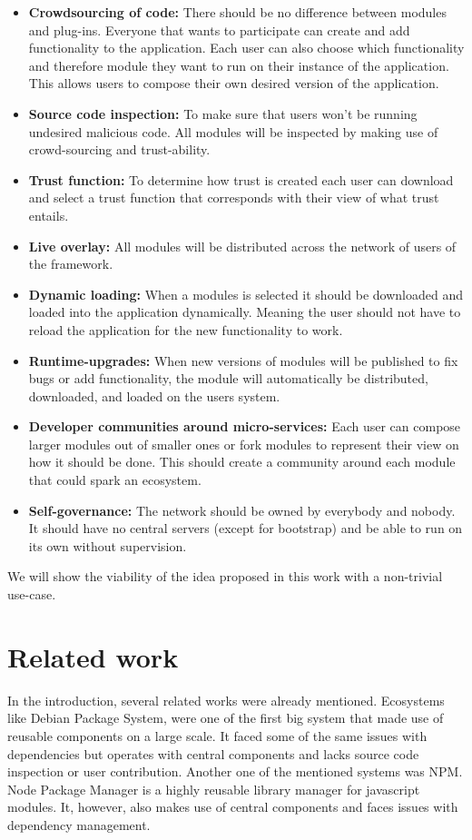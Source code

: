 \begin{itemize}
	\item \textbf{Crowdsourcing of code: } There should be no difference between modules and plug-ins. Everyone that wants to participate can create and add functionality to the application. Each user can also choose which functionality and therefore module they want to run on their instance of the application. This allows users to compose their own desired version of the application.
	\item \textbf{Source code inspection: } To make sure that users won't be running undesired malicious code. All modules will be inspected by making use of crowd-sourcing and trust-ability.
	\item \textbf{Trust function: } To determine how trust is created each user can download and select a trust function that corresponds with their view of what trust entails.
	\item \textbf{Live overlay: } All modules will be distributed across the network of users of the framework.
	\item \textbf{Dynamic loading: } When a modules is selected it should be downloaded and loaded into the application dynamically. Meaning the user should not have to reload the application for the new functionality to work.
	\item \textbf{Runtime-upgrades: } When new versions of modules will be published to fix bugs or add functionality, the module will automatically be distributed, downloaded, and loaded on the users system.
	\item \textbf{Developer communities around micro-services: } Each user can compose larger modules out of smaller ones or fork modules to represent their view on how it should be done. This should create a community around each module that could spark an ecosystem.
	\item \textbf{Self-governance: } The network should be owned by everybody and nobody. It should have no central servers (except for bootstrap) and be able to run on its own without supervision.
\end{itemize}

We will show the viability of the idea proposed in this work with a non-trivial use-case.

\section{Related work}
In the introduction, several related works were already mentioned. Ecosystems like Debian Package System, were one of the first big system that made use of reusable components on a large scale. It faced some of the same issues with dependencies but operates with central components and lacks source code inspection or user contribution. Another one of the mentioned systems was NPM. Node Package Manager is a highly reusable library manager for javascript modules. It, however, also makes use of central components and faces issues with dependency management.

